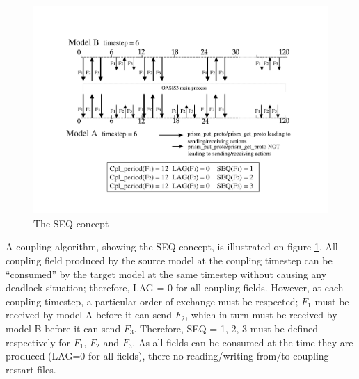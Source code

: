 \begin{figure}
\includegraphics[scale=.6]{figures/fig_seq_concept} 
\caption{The SEQ concept}
\label{fig:seq_concept}
\end{figure}

A coupling algorithm, showing the SEQ concept, is illustrated on
figure \ref{fig:seq_concept}. All coupling field produced by the
source model at the coupling timestep can be ``consumed'' by the
target model at the same timestep without causing any
deadlock situation; therefore, LAG = 0 for all coupling fields.
However, at each coupling timestep, a particular order
of exchange must be respected; $F_1$ must be received by
model A before it can send $F_2$, which in turn must be received by model B
before it can send $F_3$. Therefore, SEQ = 1, 2, 3 must be defined
respectively for $F_1$, $F_2$ and $F_3$. 
As all fields can be consumed at the time they are produced (LAG=0 for
all fields), there no reading/writing from/to coupling restart files.

